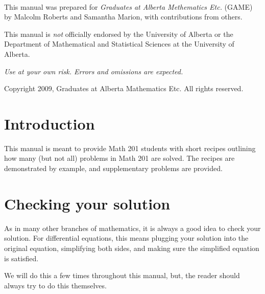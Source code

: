 \documentclass{article}
\begin{document}
\pagestyle{empty}


\newpage\
\pagestyle{empty}
\vspace{5in}

This manual was prepared for \emph{Graduates at Alberta Methematics
  Etc.} (GAME) by Malcolm Roberts and Samantha Marion, with
contributions from others.  \vspace{0.5in}

This manual is \emph{not} officially endorsed by the University of
Alberta or the Department of Mathematical and Statistical Sciences at
the University of Alberta.
\vspace{0.5in}

\emph{Use at your own risk.  Errors and omissions are expected.}
\vspace{0.5in}

Copyright 2009, Graduates at Alberta Mathematics Etc.  All rights
reserved.

\pagestyle{plain}
\newpage

\section*{Introduction}

This manual is meant to provide Math 201 students with short recipes
outlining how many (but not all) problems in Math 201 are solved.  The
recipes are demonstrated by example, and supplementary problems are
provided.

\section*{Checking your solution}

As in many other branches of mathematics, it is always a good idea to
check your solution.  For differential equations, this means plugging
your solution into the original equation, simplifying both sides, and
making sure the simplified equation is satisfied.

We will do this a few times throughout this manual, but, the reader
should always try to do this themselves.
\end{document}
